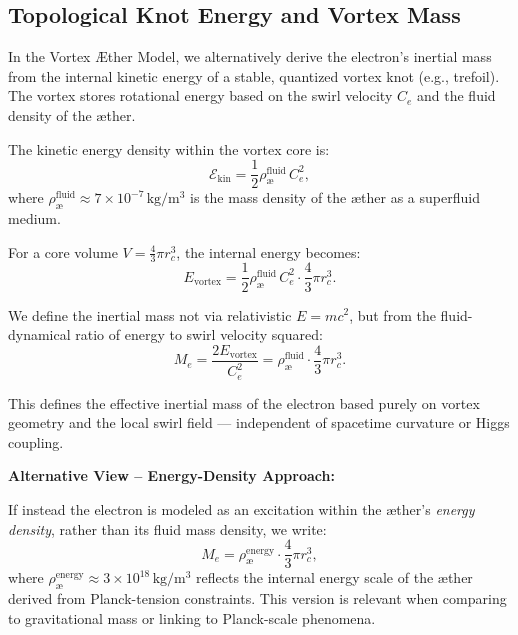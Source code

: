 \subsection{Topological Knot Energy and Vortex Mass}
\label{sec:mass-knot}

In the Vortex Æther Model, we alternatively derive the electron's inertial mass from the internal kinetic energy of a stable, quantized vortex knot (e.g., trefoil). The vortex stores rotational energy based on the swirl velocity \( C_e \) and the fluid density of the æther.

The kinetic energy density within the vortex core is:
\begin{equation*}
    \mathcal{E}_{\text{kin}} = \frac{1}{2} \rho_\text{\ae}^{\text{fluid}} \, C_e^2,
\end{equation*}
where \( \rho_\text{\ae}^{\text{fluid}} \approx 7 \times 10^{-7} \, \mathrm{kg/m^3} \) is the mass density of the æther as a superfluid medium.

For a core volume \( V = \frac{4}{3} \pi r_c^3 \), the internal energy becomes:
\begin{equation*}
    E_{\text{vortex}} = \frac{1}{2} \rho_\text{\ae}^{\text{fluid}} \, C_e^2 \cdot \frac{4}{3} \pi r_c^3.
\end{equation*}

We define the inertial mass not via relativistic \( E = mc^2 \), but from the fluid-dynamical ratio of energy to swirl velocity squared:
\begin{equation}
    M_e = \frac{2 E_{\text{vortex}}}{C_e^2} = \rho_\text{\ae}^{\text{fluid}} \cdot \frac{4}{3} \pi r_c^3.
\end{equation}

This defines the effective inertial mass of the electron based purely on vortex geometry and the local swirl field — independent of spacetime curvature or Higgs coupling.

\vspace{1em}

\textbf{Alternative View – Energy-Density Approach:}

If instead the electron is modeled as an excitation within the æther’s \textit{energy density}, rather than its fluid mass density, we write:
\begin{equation}
    M_e = \rho_\text{\ae}^{\text{energy}} \cdot \frac{4}{3} \pi r_c^3,
\end{equation}
where \( \rho_\text{\ae}^{\text{energy}} \approx 3 \times 10^{18} \, \mathrm{kg/m^3} \) reflects the internal energy scale of the æther derived from Planck-tension constraints. This version is relevant when comparing to gravitational mass or linking to Planck-scale phenomena.

